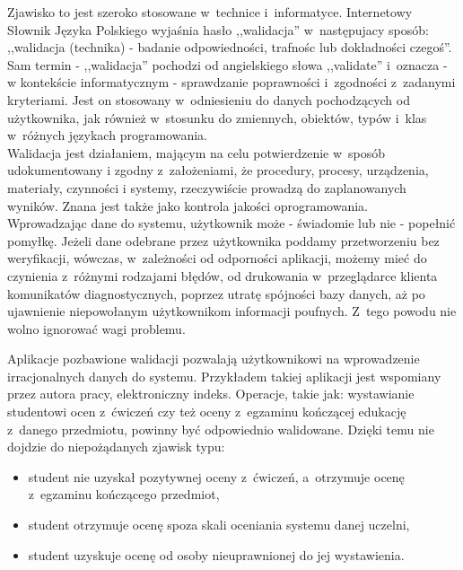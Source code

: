 \documentclass{xmgr}
\begin{document}
\indent \textcolor{wa}{Zjawisko to jest szeroko stosowane w~technice i~informatyce. Internetowy Słownik
Języka Polskiego wyjaśnia hasło ,,walidacja'' w~następujacy sposób: ,,walidacja
(technika) - badanie odpowiedności, trafnośc lub dokładności czegoś''.\cite{ValidationSJP}}
\\
\indent \textcolor{wa}{Sam termin - ,,walidacja'' pochodzi od angielskiego słowa ,,validate'' i~oznacza -
w kontekście informatycznym - sprawdzanie poprawności i~zgodności z~zadanymi
kryteriami. Jest on stosowany w~odniesieniu do danych pochodzących od użytkownika,
jak również w~stosunku do zmiennych, obiektów, typów i~klas w~różnych językach
programowania.\cite{ValidationTermin}}
\\
\indent \textcolor{wa}{Walidacja jest działaniem, mającym na celu potwierdzenie w~sposób udokumentowany
i zgodny z~założeniami, że procedury, procesy, urządzenia, materiały, czynności
i systemy, rzeczywiście prowadzą do zaplanowanych wyników. Znana jest także jako
kontrola jakości oprogramowania.\cite{Validation2}}
\\
\indent \textcolor{wa}{Wprowadzając dane do systemu, użytkownik może - świadomie lub nie - popełnić
pomyłkę. Jeżeli dane odebrane przez użytkownika poddamy przetworzeniu bez weryfikacji,
wówczas, w~zależności od odporności aplikacji, możemy mieć do czynienia z~różnymi
rodzajami błędów, od drukowania w~przeglądarce klienta komunikatów diagnostycznych,
poprzez utratę spójności bazy danych, aż po ujawnienie niepowołanym użytkownikom
informacji poufnych. Z~tego powodu nie wolno ignorować wagi problemu.}
\\
\indent \textcolor{wc}{Aplikacje pozbawione walidacji pozwalają użytkownikowi na wprowadzenie irracjonalnych
danych do systemu. Przykładem takiej aplikacji jest wspomiany przez autora pracy,
elektroniczny indeks. Operacje, takie jak: wystawianie studentowi ocen z~ćwiczeń
czy też oceny z~egzaminu kończącej edukację z~danego przedmiotu, powinny być
odpowiednio walidowane. Dzięki temu nie dojdzie do niepożądanych zjawisk typu:
\begin{itemize}
\item student nie uzyskał pozytywnej oceny z~ćwiczeń, a~otrzymuje ocenę z~egzaminu
kończącego przedmiot,
\item student otrzymuje ocenę spoza skali oceniania systemu danej uczelni,
\item student uzyskuje ocenę od osoby nieuprawnionej do jej wystawienia.
\end{itemize}}
\end{document}
